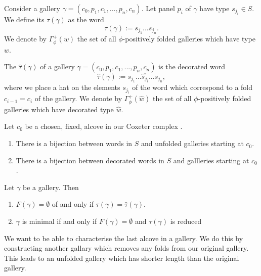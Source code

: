 \documentclass[12pt]{article}
\begin{document}
\begin{definition}
    Consider a gallery $\gamma = (c_0,p_1,c_1,...,p_n,c_n)$. Let panel $p_i$ of $\gamma$ have type $s_{j_i}\in S$. We define its  $\tau(\gamma)$ as the word 
    \[\tau(\gamma):=s_{j_1}...s_{j_n}.\]
    We denote by $\Gamma_{\phi}^+(w)$ the set of all $\phi$-positively folded galleries which have type $w$. 
\end{definition}

\begin{definition}
    The  $\hat\tau(\gamma)$ of a gallery $\gamma = (c_0,p_1,c_1,...,p_n,c_n)$ is the decorated word
    \[\hat\tau(\gamma):= s_{j_1}...\hat{s_{j_i}}...s_{j_n},\]
    where we place a hat on the elements $s_{j_i}$ of the word which correspond to a fold $c_{i-1}=c_i$ of the gallery. We denote by $\Gamma_{\phi}^+(\hat{w})$ the set of all $\phi$-positively folded galleries which have decorated type $\hat{w}$.
\end{definition}

\begin{lemma}
    Let $c_0$ be a chosen, fixed, alcove in our Coxeter complex \sg. 
    \begin{enumerate}
        \item There is a bijection between words in $S$ and unfolded galleries starting at $c_0$.
        \item There is a bijection between decorated words in $S$ and gallleries starting at $c_0$. 
    \end{enumerate}
\end{lemma}

\begin{lemma}
    Let $\gamma$ be a gallery. Then
    \begin{enumerate}
        \item $F(\gamma)=\emptyset$ of and only if $\tau(\gamma)=\hat{\tau}(\gamma).$
        \item $\gamma$ is minimal if and only if $F(\gamma)=\emptyset$ and $\tau(\gamma)$ is reduced
    \end{enumerate}
\end{lemma}

We want to be able to characterise the last alcove in a gallery. We do this by constructing another gallary which removes any folds from our original gallery. This leads to an unfolded gallery which has shorter length than the original gallery.
\end{document}
